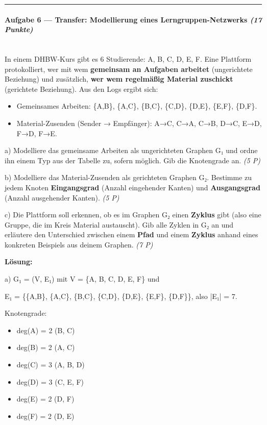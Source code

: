 \documentclass[11pt, a4paper]{article}
\begin{document}
\noindent\textcolor{rulegray}{\rule{\linewidth}{0.4pt}}


\paragraph{Aufgabe 6 — Transfer: Modellierung eines Lerngruppen-Netzwerks \textit{(17 Punkte)}}\mbox{}\\[2pt]

In einem DHBW-Kurs gibt es 6 Studierende: A, B, C, D, E, F. Eine Plattform protokolliert, wer mit wem \textbf{gemeinsam an Aufgaben arbeitet} (ungerichtete Beziehung) und zusätzlich, \textbf{wer wem regelmäßig Material zuschickt} (gerichtete Beziehung). Aus den Logs ergibt sich:


\begin{itemize}
  \item Gemeinsames Arbeiten: \{A,B\}, \{A,C\}, \{B,C\}, \{C,D\}, \{D,E\}, \{E,F\}, \{D,F\}.
  \item Material-Zusenden (Sender → Empfänger): A→C, C→A, C→B, D→C, E→D, F→D, F→E.
\end{itemize}

a) Modelliere das gemeinsame Arbeiten als ungerichteten Graphen G₁ und ordne ihn einem Typ aus der Tabelle zu, sofern möglich. Gib die Knotengrade an. \textit{(5 P)}


b) Modelliere das Material-Zusenden als gerichteten Graphen G₂. Bestimme zu jedem Knoten \textbf{Eingangsgrad} (Anzahl eingehender Kanten) und \textbf{Ausgangsgrad} (Anzahl ausgehender Kanten). \textit{(5 P)}


c) Die Plattform soll erkennen, ob es im Graphen G₂ einen \textbf{Zyklus} gibt (also eine Gruppe, die im Kreis Material austauscht). Gib alle Zyklen in G₂ an und erläutere den Unterschied zwischen einem \textbf{Pfad} und einem \textbf{Zyklus} anhand eines konkreten Beispiels aus deinem Graphen. \textit{(7 P)}


\textbf{Lösung:}


a) G₁ = (V, E₁) mit V = \{A, B, C, D, E, F\} und

E₁ = \{\{A,B\}, \{A,C\}, \{B,C\}, \{C,D\}, \{D,E\}, \{E,F\}, \{D,F\}\}, also |E₁| = 7.


Knotengrade:

\begin{itemize}
  \item deg(A) = 2 (B, C)
  \item deg(B) = 2 (A, C)
  \item deg(C) = 3 (A, B, D)
  \item deg(D) = 3 (C, E, F)
  \item deg(E) = 2 (D, F)
  \item deg(F) = 2 (D, E)
\end{itemize}
\end{document}
